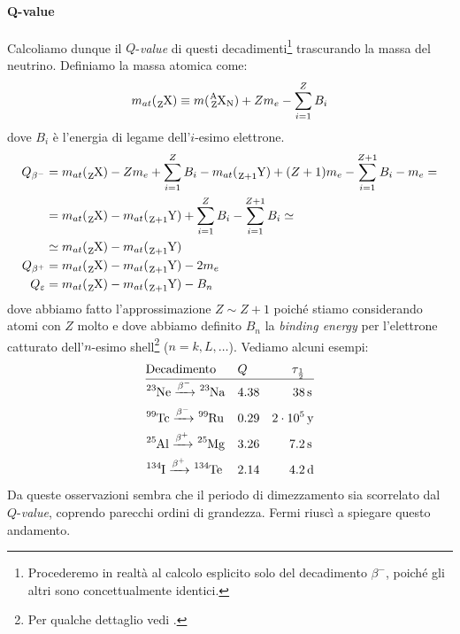 \paragraph{Q-value}\label{sec-qvalue}
Calcoliamo dunque il $Q$-\textit{value} di questi decadimenti\footnote{Procederemo in realtà al calcolo esplicito solo del decadimento $\beta^-$, poiché gli altri sono concettualmente identici.} trascurando la massa del neutrino. Definiamo la massa atomica come:
$$m_{at} (\ce{_{Z}X}) \equiv m(\ce{^A_ZX_N})+Zm_e - \sum_{i=1}^Z B_i$$
dove $B_i$ è l'energia di legame dell'$i$-esimo elettrone.
\begin{displaymath}
\begin{aligned}
Q_{\beta^-} &= m_{at}(\ce{_ZX}) - Zm_e + \sum_{i=1}^Z B_i - m_{at}(\ce{_{Z+1}Y}) + (Z+1) m_e - \sum_{i=1}^{Z+1} B_i - m_e= \\
&= m_{at}(\ce{_ZX}) - m_{at}(\ce{_{Z+1}Y}) + \sum_{i=1}^Z B_i - \sum_{i=1}^{Z+1} B_i \simeq \\
&\simeq m_{at}(\ce{_ZX}) - m_{at}(\ce{_{Z+1}Y}) \\
Q_{\beta^+} &= m_{at}(\ce{_ZX}) - m_{at}(\ce{_{Z+1}Y}) - 2m_e \\
Q_{\varepsilon} &= m_{at}(\ce{_ZX}) - m_{at}(\ce{_{Z+1}Y}) - B_n
\end{aligned}
\end{displaymath}
dove abbiamo fatto l'approssimazione $Z\sim Z+1$ poiché stiamo considerando atomi con $Z$ molto  e dove abbiamo definito $B_n$ la \textit{binding energy} per l'elettrone catturato dell'$n$-esimo shell\footnote{Per qualche dettaglio vedi .} ($n = k,L,\dots$). Vediamo alcuni esempi:
\begin{displaymath}
\begin{aligned}
&\text{Decadimento} & &Q & \tau_{\frac{1}{2}}& \\
\hline
&\ce{^{23}Ne} \betamin \ce{^{23}Na} & &4.38 & 38&\,\mbox{s} \\
&\ce{^{99}Tc} \betamin \ce{^{99}Ru} & &0.29 & 2\cdot 10^5&\,\mbox{y} \\
&\ce{^{25}Al} \betaplu \ce{^{25}Mg} & &3.26 & 7.2&\,\mbox{s} \\
&\ce{^{134}I} \betaplu \ce{^{134}Te} & &2.14 & 4.2&\,\mbox{d} \\
\end{aligned}
\end{displaymath}
Da queste osservazioni sembra che il periodo di dimezzamento sia scorrelato dal $Q$-\textit{value}, coprendo parecchi ordini di grandezza. Fermi riuscì a spiegare questo andamento.